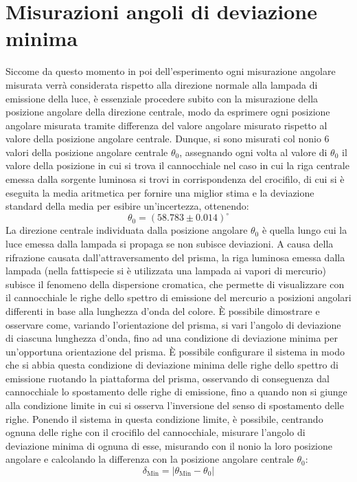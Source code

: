 \documentclass[a4paper,12pt]{article}
\begin{document}
\section{Misurazioni angoli di deviazione minima}
Siccome da questo momento in poi dell’esperimento ogni misurazione angolare misurata verrà considerata rispetto alla direzione normale alla lampada di emissione della luce, è essenziale procedere subito con la misurazione della posizione angolare della direzione centrale, modo da esprimere ogni posizione angolare misurata tramite differenza del valore angolare misurato rispetto al valore della posizione angolare centrale.
Dunque, si sono misurati col nonio 6 valori della posizione angolare centrale \( \theta_0 \), assegnando ogni volta al valore di \( \theta_0 \) il valore della posizione in cui si trova il cannocchiale nel caso in cui la riga centrale emessa dalla sorgente luminosa si trovi in corrispondenza del crocifilo, di cui si è eseguita la media aritmetica per fornire una miglior stima e la deviazione standard della media per esibire un’incertezza, ottenendo:
\[
\theta_0 = (58.783 \pm 0.014)^\circ
\]
La direzione centrale individuata dalla posizione angolare \( \theta_0 \) è quella lungo cui la luce emessa dalla lampada si propaga se non subisce deviazioni.
A causa della rifrazione causata dall’attraversamento del prisma, la riga luminosa emessa dalla lampada (nella fattispecie si è utilizzata una lampada ai vapori di mercurio) subisce il fenomeno della dispersione cromatica, che permette di visualizzare con il cannocchiale le righe dello spettro di emissione del mercurio a posizioni angolari differenti in base alla lunghezza d’onda del colore.
È possibile dimostrare e osservare come, variando l’orientazione del prisma, si vari l’angolo di deviazione di ciascuna lunghezza d’onda, fino ad una condizione di deviazione minima per un’opportuna orientazione del prisma.
È possibile configurare il sistema in modo che si abbia questa condizione di deviazione minima delle righe dello spettro di emissione ruotando la piattaforma del prisma, osservando di conseguenza dal cannocchiale lo spostamento delle righe di emissione, fino a quando non si giunge alla condizione limite in cui si osserva l’inversione del senso di spostamento delle righe.
Ponendo il sistema in questa condizione limite, è possibile, centrando ognuna delle righe con il crocifilo del cannocchiale, misurare l’angolo di deviazione minima di ognuna di esse, misurando con il nonio la loro posizione angolare e calcolando la differenza con la posizione angolare centrale \( \theta_0 \):
\[
\delta_{\text{Min}} = |\theta_{\text{Min}} - \theta_0|
\]
\end{document}
